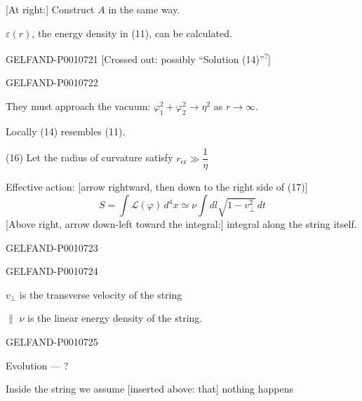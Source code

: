 [At right:] Construct $A$ in the same way.

$\varepsilon(r)$, the energy density in (11), can be calculated.


\begin{GelfandAdjacentEvidence}{GELFAND-P001072}{1}
[Crossed out: possibly “Solution (14)”\textsuperscript{?}]
\end{GelfandAdjacentEvidence}
\begin{GelfandAdjacentEvidence}{GELFAND-P001072}{2}


They must approach the vacuum: $\varphi_1^2+\varphi_2^2\to\eta^2$ as $r\to\infty$.

Locally (14) resembles (11).

(16) Let the radius of curvature satisfy $r_{\text{cr}}\gg\dfrac1\eta$

Effective action: [arrow rightward, then down to the right side of (17)]
\begin{equation*}
S=\int\mathcal L(\varphi)\,d^4x\simeq\nu\int dl\sqrt{1-v_{\perp}^2}\,dt
\tag{17}
\end{equation*}
[Above right, arrow down-left toward the integral:] integral along the string itself.
\end{GelfandAdjacentEvidence}
\begin{GelfandAdjacentEvidence}{GELFAND-P001072}{3}

\end{GelfandAdjacentEvidence}
\begin{GelfandAdjacentEvidence}{GELFAND-P001072}{4}


$v_\perp$ is the transverse velocity of the string

\(\parallel\) $\nu$ is the linear energy density of the string.
\end{GelfandAdjacentEvidence}
\begin{GelfandAdjacentEvidence}{GELFAND-P001072}{5}


Evolution — ?

Inside the string we assume [inserted above: that] nothing happens
\end{GelfandAdjacentEvidence}
